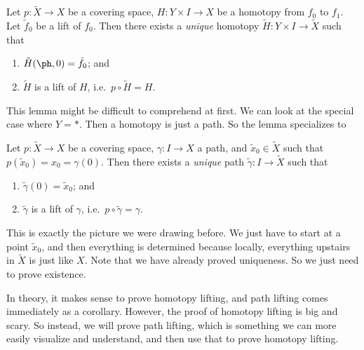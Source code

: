 \documentclass[a4paper]{article}
\begin{document}
\begin{lemma}
  Let $p: \tilde{X} \to X$ be a covering space, $H: Y\times I \to X$ be a homotopy from $f_0$ to $f_1$. Let $\tilde{f}_0$ be a lift of $f_0$. Then there exists a \emph{unique} homotopy $\tilde{H}: Y\times I \to \tilde{X}$ such that
  \begin{enumerate}
    \item $\tilde{H}(\ph, 0) = \tilde{f}_0$; and
    \item $\tilde{H}$ is a lift of $H$, i.e.\ $p\circ\tilde{H} = H$.
  \end{enumerate}
\end{lemma}
This lemma might be difficult to comprehend at first. We can look at the special case where $Y = *$. Then a homotopy is just a path. So the lemma specializes to
\begin{lemma}
  Let $p: \tilde{X} \to X$ be a covering space, $\gamma: I\to X$ a path, and $\tilde{x}_0 \in \tilde{X}$ such that $p(\tilde{x}_0) = x_0 = \gamma(0)$. Then there exists a \emph{unique} path $\tilde{\gamma}: I\to \tilde{X}$ such that
  \begin{enumerate}
    \item $\tilde{\gamma}(0) = \tilde{x}_0$; and
    \item $\tilde{\gamma}$ is a lift of $\gamma$, i.e.\ $p\circ \tilde{\gamma} = \gamma$.
  \end{enumerate}
\end{lemma}
This is exactly the picture we were drawing before. We just have to start at a point $\tilde{x}_0$, and then everything is determined because locally, everything upstairs in $\tilde{X}$ is just like $X$. Note that we have already proved uniqueness. So we just need to prove existence.

In theory, it makes sense to prove homotopy lifting, and path lifting comes immediately as a corollary. However, the proof of homotopy lifting is big and scary. So instead, we will prove path lifting, which is something we can more easily visualize and understand, and then use that to prove homotopy lifting.
\end{document}
